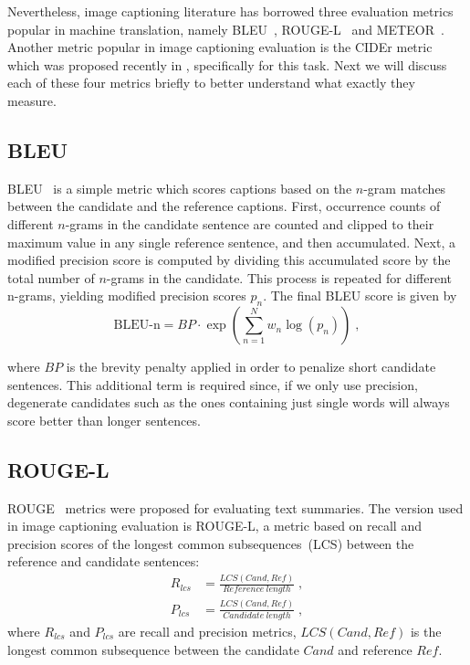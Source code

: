 Nevertheless, image captioning literature has borrowed three evaluation metrics
popular in machine translation, namely BLEU~\cite{Papineni:BLEU},
ROUGE-L~\cite{lin2004rouge} and METEOR~\cite{denkowski-lavie:2014:Meteor}.
Another metric popular in image captioning evaluation is the CIDEr metric which
was proposed recently in \cite{Vedantam_2015_CVPR}, specifically for this task.
Next we will discuss each of these four metrics briefly to better understand
what exactly they measure.

\subsection{BLEU}

BLEU~\cite{Papineni:BLEU} is a simple metric which scores captions based on the
$n$-gram matches between the candidate and the reference captions.
First, occurrence counts of different $n$-grams in the candidate sentence are
counted and clipped to their maximum value in any single reference sentence,
and then accumulated.
Next, a modified precision score is computed by dividing this accumulated score
by the total number of $n$-grams in the candidate.
This process is repeated for different n-grams, yielding modified precision
scores $p_n$.
The final BLEU score is given by
\begin{equation}
    \text{BLEU-n} = BP\cdot{}\exp(\sum_{n=1}^{N}w_{n}\log(p_n)) \; ,
\end{equation}

\noindent where $BP$ is the brevity penalty applied in order to penalize
short candidate sentences.
This additional term is required since, if we only use precision, degenerate
candidates such as the ones containing just single words will always score
better than longer sentences.
\subsection{ROUGE-L}
ROUGE~\cite{lin2004rouge} metrics were proposed for evaluating text summaries.
The version used in image captioning evaluation is ROUGE-L, a metric based on
recall and precision scores of the longest common subsequences~(LCS) between the
reference and candidate sentences:
\begin{align}
        R_{lcs} &= \frac{LCS(Cand,Ref)}{Reference\ length} \; ,\\[0.75ex]
        P_{lcs} &= \frac{LCS(Cand,Ref)}{Candidate\ length} \; ,
\end{align}
\noindent where $R_{lcs}$ and $P_{lcs}$ are recall and precision metrics,
$LCS(Cand,Ref)$ is the longest common subsequence between the candidate $Cand$ and reference
$Ref$.

